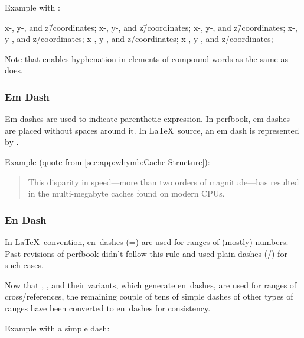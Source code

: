 Example with \qco{\\=/}:

\begin{center}\begin{minipage}{2.55in}\vspace{0.6\baselineskip}
x-, y-, and z\=/coordinates; x-, y-, and z\=/coordinates;
x-, y-, and z\=/coordinates; x-, y-, and z\=/coordinates;
x-, y-, and z\=/coordinates; x-, y-, and z\=/coordinates;
\vspace{0.6\baselineskip}\end{minipage}\end{center}

Note that \qco{\\=/} enables hyphenation in elements
of compound words as the same as \qco{\\-/} does.

\subsubsection{Em Dash}
\label{sec:app:styleguide:Em Dash}

Em dashes are used to indicate parenthetic expression.
In perfbook, em dashes are placed without spaces around it.
In \LaTeX\ source, an em dash is represented by \qco{---}.

Example (quote from \cref{sec:app:whymb:Cache Structure}):
\begin{quote}
  This disparity in speed---more than two orders of magnitude---has
  resulted in the multi-megabyte caches found on modern CPUs.
\end{quote}

\subsubsection{En Dash}
\label{sec:app;styleguide:En Dash}

In \LaTeX\ convention, en~dashes (\==) are used for ranges of (mostly)
numbers.
Past revisions of perfbook didn't follow this rule and used
plain dashes (\=/) for such cases.

Now that \co{\\clnrefrange}, \co{\\crefrange},
and their variants, which generate en~dashes, are used for ranges of
cross\-/references, the remaining couple of tens of simple dashes
of other types of ranges have been converted to en~dashes for
consistency.

Example with a simple dash:

